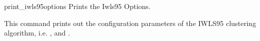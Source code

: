 \begin{nusmvCommand} {print\_iwls95options} {Prints the Iwls95 Options.}


This command prints out the configuration parameters of the IWLS95
clustering algorithm, i.e.  ,
 and .

\end{nusmvCommand}
